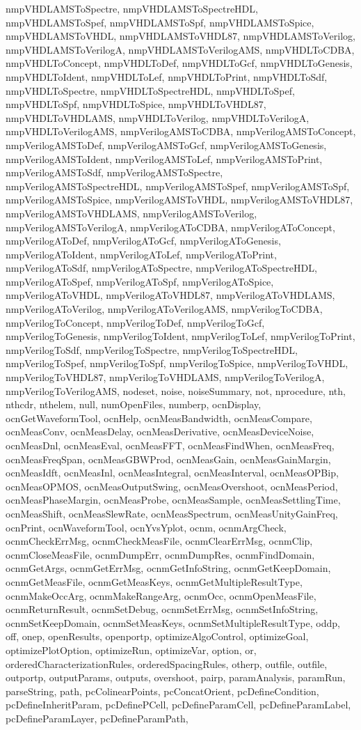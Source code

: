{{nmpVHDLAMSToSpectre, nmpVHDLAMSToSpectreHDL, nmpVHDLAMSToSpef, nmpVHDLAMSToSpf, nmpVHDLAMSToSpice, nmpVHDLAMSToVHDL, nmpVHDLAMSToVHDL87, nmpVHDLAMSToVerilog, nmpVHDLAMSToVerilogA, nmpVHDLAMSToVerilogAMS, nmpVHDLToCDBA, nmpVHDLToConcept, nmpVHDLToDef, nmpVHDLToGcf, nmpVHDLToGenesis, nmpVHDLToIdent, nmpVHDLToLef, nmpVHDLToPrint, nmpVHDLToSdf, nmpVHDLToSpectre, nmpVHDLToSpectreHDL, nmpVHDLToSpef, nmpVHDLToSpf, nmpVHDLToSpice, nmpVHDLToVHDL87, nmpVHDLToVHDLAMS, nmpVHDLToVerilog, nmpVHDLToVerilogA, nmpVHDLToVerilogAMS, nmpVerilogAMSToCDBA, nmpVerilogAMSToConcept, nmpVerilogAMSToDef, nmpVerilogAMSToGcf, nmpVerilogAMSToGenesis, nmpVerilogAMSToIdent, nmpVerilogAMSToLef, nmpVerilogAMSToPrint, nmpVerilogAMSToSdf, nmpVerilogAMSToSpectre, nmpVerilogAMSToSpectreHDL, nmpVerilogAMSToSpef, nmpVerilogAMSToSpf, nmpVerilogAMSToSpice, nmpVerilogAMSToVHDL, nmpVerilogAMSToVHDL87, nmpVerilogAMSToVHDLAMS, nmpVerilogAMSToVerilog, nmpVerilogAMSToVerilogA, nmpVerilogAToCDBA, nmpVerilogAToConcept, nmpVerilogAToDef, nmpVerilogAToGcf, nmpVerilogAToGenesis, nmpVerilogAToIdent, nmpVerilogAToLef, nmpVerilogAToPrint, nmpVerilogAToSdf, nmpVerilogAToSpectre, nmpVerilogAToSpectreHDL, nmpVerilogAToSpef, nmpVerilogAToSpf, nmpVerilogAToSpice, nmpVerilogAToVHDL, nmpVerilogAToVHDL87, nmpVerilogAToVHDLAMS, nmpVerilogAToVerilog, nmpVerilogAToVerilogAMS, nmpVerilogToCDBA, nmpVerilogToConcept, nmpVerilogToDef, nmpVerilogToGcf, nmpVerilogToGenesis, nmpVerilogToIdent, nmpVerilogToLef, nmpVerilogToPrint, nmpVerilogToSdf, nmpVerilogToSpectre, nmpVerilogToSpectreHDL, nmpVerilogToSpef, nmpVerilogToSpf, nmpVerilogToSpice, nmpVerilogToVHDL, nmpVerilogToVHDL87, nmpVerilogToVHDLAMS, nmpVerilogToVerilogA, nmpVerilogToVerilogAMS, nodeset, noise, noiseSummary, not, nprocedure, nth, nthcdr, nthelem, null, numOpenFiles, numberp, ocnDisplay, ocnGetWaveformTool, ocnHelp, ocnMeasBandwidth, ocnMeasCompare, ocnMeasConv, ocnMeasDelay, ocnMeasDerivative, ocnMeasDeviceNoise, ocnMeasDnl, ocnMeasEval, ocnMeasFFT, ocnMeasFindWhen, ocnMeasFreq, ocnMeasFreqSpan, ocnMeasGBWProd, ocnMeasGain, ocnMeasGainMargin, ocnMeasIdft, ocnMeasInl, ocnMeasIntegral, ocnMeasInterval, ocnMeasOPBip, ocnMeasOPMOS, ocnMeasOutputSwing, ocnMeasOvershoot, ocnMeasPeriod, ocnMeasPhaseMargin, ocnMeasProbe, ocnMeasSample, ocnMeasSettlingTime, ocnMeasShift, ocnMeasSlewRate, ocnMeasSpectrum, ocnMeasUnityGainFreq, ocnPrint, ocnWaveformTool, ocnYvsYplot, ocnm, ocnmArgCheck, ocnmCheckErrMsg, ocnmCheckMeasFile, ocnmClearErrMsg, ocnmClip, ocnmCloseMeasFile, ocnmDumpErr, ocnmDumpRes, ocnmFindDomain, ocnmGetArgs, ocnmGetErrMsg, ocnmGetInfoString, ocnmGetKeepDomain, ocnmGetMeasFile, ocnmGetMeasKeys, ocnmGetMultipleResultType, ocnmMakeOccArg, ocnmMakeRangeArg, ocnmOcc, ocnmOpenMeasFile, ocnmReturnResult, ocnmSetDebug, ocnmSetErrMsg, ocnmSetInfoString, ocnmSetKeepDomain, ocnmSetMeasKeys, ocnmSetMultipleResultType, oddp, off, onep, openResults, openportp, optimizeAlgoControl, optimizeGoal, optimizePlotOption, optimizeRun, optimizeVar, option, or, orderedCharacterizationRules, orderedSpacingRules, otherp, outfile, outfile, outportp, outputParams, outputs, overshoot, pairp, paramAnalysis, paramRun, parseString, path, pcColinearPoints, pcConcatOrient, pcDefineCondition, pcDefineInheritParam, pcDefinePCell, pcDefineParamCell, pcDefineParamLabel, pcDefineParamLayer, pcDefineParamPath, }}
